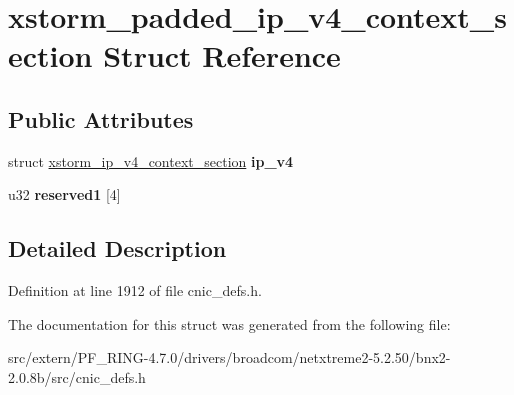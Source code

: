 \hypertarget{structxstorm__padded__ip__v4__context__section}{
\section{xstorm\_\-padded\_\-ip\_\-v4\_\-context\_\-section Struct Reference}
\label{structxstorm__padded__ip__v4__context__section}
}
\subsection*{Public Attributes}
\begin{DoxyCompactItemize}
\item 
\hypertarget{structxstorm__padded__ip__v4__context__section_a2975a4d1751a7d3f8a68581ca851474a}{
struct \hyperlink{structxstorm__ip__v4__context__section}{xstorm\_\-ip\_\-v4\_\-context\_\-section} {\bfseries ip\_\-v4}}
\label{structxstorm__padded__ip__v4__context__section_a2975a4d1751a7d3f8a68581ca851474a}

\item 
\hypertarget{structxstorm__padded__ip__v4__context__section_a9b2433edcb76bbdd46d834b87ade4339}{
u32 {\bfseries reserved1} \mbox{[}4\mbox{]}}
\label{structxstorm__padded__ip__v4__context__section_a9b2433edcb76bbdd46d834b87ade4339}

\end{DoxyCompactItemize}


\subsection{Detailed Description}


Definition at line 1912 of file cnic\_\-defs.h.



The documentation for this struct was generated from the following file:\begin{DoxyCompactItemize}
\item 
src/extern/PF\_\-RING-\/4.7.0/drivers/broadcom/netxtreme2-\/5.2.50/bnx2-\/2.0.8b/src/cnic\_\-defs.h\end{DoxyCompactItemize}
